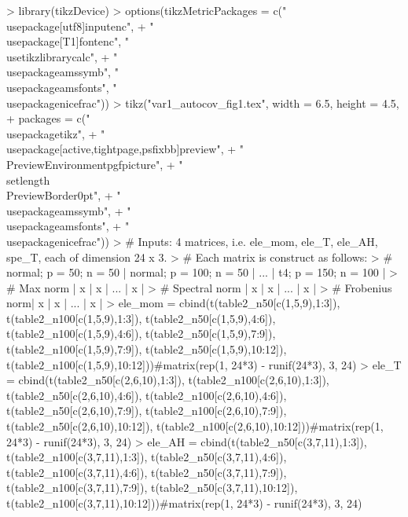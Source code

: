 \documentclass{article}
\begin{document}
\begin{Schunk}
\begin{Sinput}
> library(tikzDevice)
> options(tikzMetricPackages = c("\\usepackage[utf8]{inputenc}",
+     "\\usepackage[T1]{fontenc}", "\\usetikzlibrary{calc}",
+     "\\usepackage{amssymb}", "\\usepackage{amsfonts}", "\\usepackage{nicefrac}"))
> tikz("var1_autocov_fig1.tex", width = 6.5, height = 4.5,
+      packages = c("\\usepackage{tikz}",
+                  "\\usepackage[active,tightpage,psfixbb]{preview}",
+                  "\\PreviewEnvironment{pgfpicture}",
+                  "\\setlength\\PreviewBorder{0pt}",
+                  "\\usepackage{amssymb}",
+                  "\\usepackage{amsfonts}",
+                  "\\usepackage{nicefrac}"))
> # Inputs: 4 matrices, i.e. ele_mom, ele_T, ele_AH, spe_T, each of dimension 24 x 3.
> # Each matrix is construct as follows:
> #                normal; p = 50; n = 50 | normal; p = 100; n = 50 | ... | t4; p = 150; n = 100 |
> # Max norm      |            x          |         x               | ... |         x            |
> # Spectral norm |            x          |         x               | ... |         x            |
> # Frobenius norm|            x          |         x               | ... |         x            |
> ele_mom = cbind(t(table2_n50[c(1,5,9),1:3]), t(table2_n100[c(1,5,9),1:3]), t(table2_n50[c(1,5,9),4:6]), t(table2_n100[c(1,5,9),4:6]), t(table2_n50[c(1,5,9),7:9]), t(table2_n100[c(1,5,9),7:9]), t(table2_n50[c(1,5,9),10:12]), t(table2_n100[c(1,5,9),10:12]))#matrix(rep(1, 24*3) - runif(24*3), 3, 24)
> ele_T = cbind(t(table2_n50[c(2,6,10),1:3]), t(table2_n100[c(2,6,10),1:3]), t(table2_n50[c(2,6,10),4:6]), t(table2_n100[c(2,6,10),4:6]), t(table2_n50[c(2,6,10),7:9]), t(table2_n100[c(2,6,10),7:9]), t(table2_n50[c(2,6,10),10:12]), t(table2_n100[c(2,6,10),10:12]))#matrix(rep(1, 24*3) - runif(24*3), 3, 24)
> ele_AH = cbind(t(table2_n50[c(3,7,11),1:3]), t(table2_n100[c(3,7,11),1:3]), t(table2_n50[c(3,7,11),4:6]), t(table2_n100[c(3,7,11),4:6]), t(table2_n50[c(3,7,11),7:9]), t(table2_n100[c(3,7,11),7:9]), t(table2_n50[c(3,7,11),10:12]), t(table2_n100[c(3,7,11),10:12]))#matrix(rep(1, 24*3) - runif(24*3), 3, 24)

\end{Sinput}
\end{Schunk}
\end{document}
